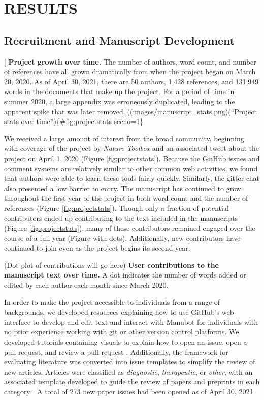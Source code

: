 \documentclass[sigconf]{acmart}
\begin{document}
\hypertarget{results}{%
\section{RESULTS}\label{results}}

\hypertarget{recruitment-and-manuscript-development}{%
\subsection{Recruitment and Manuscript Development}\label{recruitment-and-manuscript-development}}

{[}
\textbf{Project growth over time.}
The number of authors, word count, and number of references have all grown dramatically from when the project began on March 20, 2020.
As of April 30, 2021, there are 50 authors, 1,428 references, and 131,949 words in the documents that make up the project.
For a period of time in summer 2020, a large appendix was erroneously duplicated, leading to the apparent spike that was later removed.{]}((images/manuscript\_stats.png)(``Project stats over time'')\{\#fig:projectstats secno=1\}

We received a large amount of interest from the broad community, beginning with coverage of the project by \emph{Nature Toolbox} \citep{AE0QcVgJ} and an associated tweet about the project on April 1, 2020 \citep{Ygqb6P2w} (Figure \ref{fig:projectstats}).
Because the GitHub issues and comment systems are relatively similar to other common web activities, we found that authors were able to learn these tools fairly quickly.
Similarly, the gitter chat also presented a low barrier to entry.
The manuscript has continued to grow throughout the first year of the project in both word count and the number of references (Figure \ref{fig:projectstats}).
Though only a fraction of potential contributors ended up contributing to the text included in the manuscripts (Figure \ref{fig:projectstats}), many of these contributors remained engaged over the course of a full year (Figure with dots).
Additionally, new contributors have continued to join even as the project begins its second year.

(Dot plot of contributions will go here)
\textbf{User contributions to the manuscript text over time.}
A dot indicates the number of words added or edited by each author each month since March 2020.

In order to make the project accessible to individuals from a range of backgrounds, we developed resources explaining how to use GitHub's web interface to develop and edit text and interact with Manubot for individuals with no prior experience working with git or other version control platforms.
We developed tutorials containing visuals to explain how to open an issue, open a pull request, and review a pull request \citep{cvGxPklV, R9PRcdKq}.
Additionally, the framework for evaluating literature was converted into issue templates to simplify the review of new articles.
Articles were classified as \emph{diagnostic}, \emph{therapeutic}, or \emph{other}, with an associated template developed to guide the review of papers and preprints in each category \citep{veonj9Vk}.
A total of 273 new paper issues had been opened as of April 30, 2021.
\end{document}
